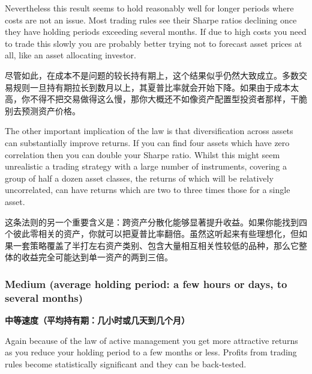 \bipairgap

\begin{englishblock} Nevertheless this result seems to hold reasonably well for longer periods where costs are not an issue. Most trading rules see their Sharpe ratios declining once they have holding periods exceeding several months. If due to high costs you need to trade this slowly you are probably better trying not to forecast asset prices at all, like an asset allocating investor. \end{englishblock}

\begin{chineseblock}尽管如此，在成本不是问题的较长持有期上，这个结果似乎仍然大致成立。多数交易规则一旦持有期拉长到数月以上，其夏普比率就会开始下降。如果由于成本太高，你不得不把交易做得这么慢，那你大概还不如像资产配置型投资者那样，干脆别去预测资产价格。\end{chineseblock}

\bipairgap

\begin{englishblock} The other important implication of the law is that diversification across assets can substantially improve returns. If you can find four assets which have zero correlation then you can double your Sharpe ratio. Whilst this might seem unrealistic a trading strategy with a large number of instruments, covering a group of half a dozen asset classes, the returns of which will be relatively uncorrelated, can have returns which are two to three times those for a single asset. \end{englishblock}

\begin{chineseblock}这条法则的另一个重要含义是：跨资产分散化能够显著提升收益。如果你能找到四个彼此零相关的资产，你就可以把夏普比率翻倍。虽然这听起来有些理想化，但如果一套策略覆盖了半打左右资产类别、包含大量相互相关性较低的品种，那么它整体的收益完全可能达到单一资产的两到三倍。\end{chineseblock}

\subsubsection*{Medium (average holding period: a few hours or days, to several months)} \medskip \noindent\textbf{中等速度（平均持有期：几小时或几天到几个月）} \par \smallskip

\begin{englishblock} Again because of the law of active management you get more attractive returns as you reduce your holding period to a few months or less. Profits from trading rules become statistically significant and they can be back-tested. \end{englishblock}

